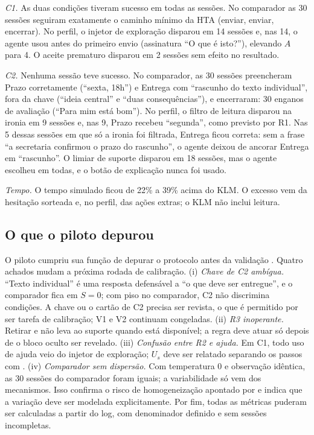 \emph{C1.} As duas condições tiveram sucesso em todas as sessões. No comparador as 30 sessões seguiram exatamente o caminho mínimo da HTA (enviar, enviar, encerrar). No perfil, o injetor de exploração disparou em 14 sessões e, nas 14, o agente usou  antes do primeiro envio (assinatura ``O que é isto?''), elevando $A$ para 4. O aceite prematuro disparou em 2 sessões sem efeito no resultado.

\emph{C2.} Nenhuma sessão teve sucesso. No comparador, as 30 sessões preencheram Prazo corretamente (``sexta, 18h'') e Entrega com ``rascunho do texto individual'', fora da chave (``ideia central'' e ``duas consequências''), e encerraram: 30 enganos de avaliação (``Para mim está bom''). No perfil, o filtro de leitura disparou na ironia em 9 sessões e, nas 9, Prazo recebeu ``segunda'', como previsto por R1. Nas 5 dessas sessões em que só a ironia foi filtrada, Entrega ficou correta: sem a frase ``a secretaria confirmou o prazo do rascunho'', o agente deixou de ancorar Entrega em ``rascunho''. O limiar de suporte disparou em 18 sessões, mas o agente escolheu  em todas, e o botão de explicação nunca foi usado.

\emph{Tempo.} O tempo simulado ficou de 22\% a 39\% acima do KLM. O excesso vem da hesitação sorteada e, no perfil, das ações extras; o KLM não inclui leitura.

\subsection{O que o piloto depurou}
O piloto cumpriu sua função de depurar o protocolo antes da validação \cite{lara2026p3}. Quatro achados mudam a próxima rodada de calibração.
(i) \emph{Chave de C2 ambígua.} ``Texto individual'' é uma resposta defensável a ``o que deve ser entregue'', e o comparador fica em $S=0$; com piso no comparador, C2 não discrimina condições. A chave ou o cartão de C2 precisa ser revista, o que é permitido por ser tarefa de calibração; V1 e V2 continuam congeladas.
(ii) \emph{R3 inoperante.} Retirar  e  não leva ao suporte quando  está disponível; a regra deve atuar só depois de o bloco oculto ser revelado.
(iii) \emph{Confusão entre R2 e ajuda.} Em C1, todo uso de ajuda veio do injetor de exploração; $U_s$ deve ser relatado separando os passos com .
(iv) \emph{Comparador sem dispersão.} Com temperatura 0 e observação idêntica, as 30 sessões do comparador foram iguais; a variabilidade só vem dos mecanismos. Isso confirma o risco de homogeneização apontado por \cite{wang2025} e indica que a variação deve ser modelada explicitamente.
Por fim, todas as métricas puderam ser calculadas a partir do log, com denominador definido e sem sessões incompletas.
